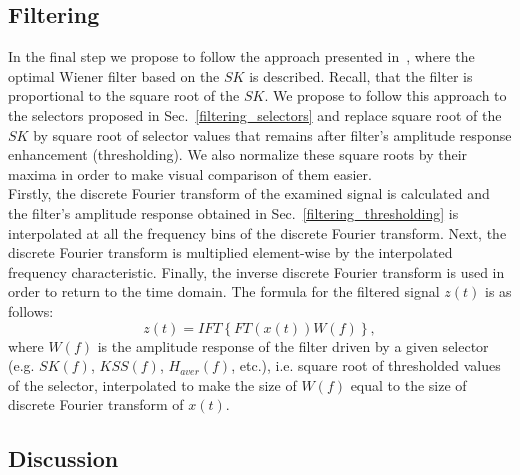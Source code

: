 \subsection{Filtering}
In the final step we propose to follow the approach presented in~\cite{Combet2009652}, where the optimal Wiener filter based on the $SK$ is described. Recall, that the filter is proportional to the square root of the $SK$. We propose to follow this approach to the selectors proposed in Sec.~\ref{filtering_selectors} and replace square root of the $SK$ by square root of selector values that remains after filter's amplitude response enhancement (thresholding). We also normalize these square roots by their maxima in order to make visual comparison of them easier.\\
Firstly, the discrete Fourier transform of the examined signal is calculated and the filter's amplitude response obtained in Sec.~\ref{filtering_thresholding} is interpolated at all the frequency bins of the discrete Fourier transform. Next, the discrete Fourier transform is multiplied element-wise by the interpolated frequency characteristic. Finally, the inverse discrete Fourier transform is used in order to return to the time domain. The formula for the filtered signal $z(t)$ is as follows:
\begin{equation}
z(t)=IFT\left\{{FT\left(x(t)\right)}{W(f)}\right\},
\end{equation}
where $W(f)$ is the amplitude response of the filter driven by a given selector (e.g. $SK(f)$, $KSS(f)$, $H_{aver}(f)$, etc.), i.e. square root of thresholded values of the selector, interpolated to make the size of $W(f)$ equal to the size of discrete Fourier transform of $x(t)$.
\FloatBarrier
\subsection{Discussion}\label{methodology_filtering_discussion}

